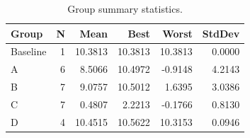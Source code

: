 \begin{table}[htbp]
\centering
\caption{Group summary statistics.}
\label{tab:group_summary}
\begin{tabular}{lrrrrr}
\toprule
\textbf{Group} & \textbf{N} & \textbf{Mean} & \textbf{Best} & \textbf{Worst} & \textbf{StdDev} \\
\midrule
Baseline & 1 & 10.3813 & 10.3813 & 10.3813 & 0.0000 \\
A & 6 & 8.5066 & 10.4972 & -0.9148 & 4.2143 \\
B & 7 & 9.0757 & 10.5012 & 1.6395 & 3.0386 \\
C & 7 & 0.4807 & 2.2213 & -0.1766 & 0.8130 \\
D & 4 & 10.4515 & 10.5622 & 10.3153 & 0.0946 \\
\bottomrule
\end{tabular}
\end{table}